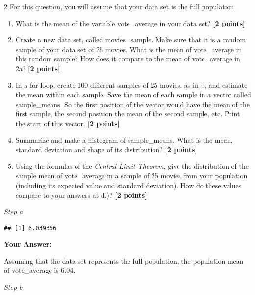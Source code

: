 \documentclass[
]{article}
\newenvironment{Shaded}{\begin{snugshade}}{\end{snugshade}}
\newcommand{\CommentTok}[1]{\textcolor[rgb]{0.56,0.35,0.01}{\textit{#1}}}
\newcommand{\DecValTok}[1]{\textcolor[rgb]{0.00,0.00,0.81}{#1}}
\newcommand{\DocumentationTok}[1]{\textcolor[rgb]{0.56,0.35,0.01}{\textbf{\textit{#1}}}}
\newcommand{\FunctionTok}[1]{\textcolor[rgb]{0.13,0.29,0.53}{\textbf{#1}}}
\newcommand{\NormalTok}[1]{#1}
\newcommand{\OtherTok}[1]{\textcolor[rgb]{0.56,0.35,0.01}{#1}}
\newcommand{\SpecialCharTok}[1]{\textcolor[rgb]{0.81,0.36,0.00}{\textbf{#1}}}
\providecommand{\tightlist}{%
  \setlength{\itemsep}{0pt}\setlength{\parskip}{0pt}}
\begin{document}
2 For this question, you will assume that your data set is the full
population.

\begin{enumerate}
\def\labelenumi{\alph{enumi}.}
\tightlist
\item
  What is the mean of the variable vote\_average in your data set?
  \textbf{[2 points]}
\item
  Create a new data set, called movies\_sample. Make sure that it is a
  random sample of your data set of 25 movies. What is the mean of
  vote\_average in this random sample? How does it compare to the mean
  of vote\_average in 2a? \textbf{[2 points]}
\item
  In a for loop, create 100 different samples of 25 movies, as in b, and
  estimate the mean within each sample. Save the mean of each sample in
  a vector called sample\_means. So the first position of the vector
  would have the mean of the first sample, the second position the mean
  of the second sample, etc. Print the start of this vector.
  \textbf{[2 points]}
\item
  Summarize and make a histogram of sample\_means. What is the mean,
  standard deviation and shape of its distribution? \textbf{[2 points]}
\item
  Using the formulas of the \emph{Central Limit Theorem}, give the
  distribution of the sample mean of vote\_average in a sample of 25
  movies from your population (including its expected value and standard
  deviation). How do these values compare to your answers at d.)?
  \textbf{[2 points]}
\end{enumerate}

\emph{Step a}

\begin{Shaded}
\end{Shaded}

\begin{verbatim}
## [1] 6.039356
\end{verbatim}

\textbf{Your Answer:}

Assuming that the data set represents the full population, the
population mean of vote\_average is 6.04.

\emph{Step b}

\begin{Shaded}
\end{Shaded}
\end{document}
